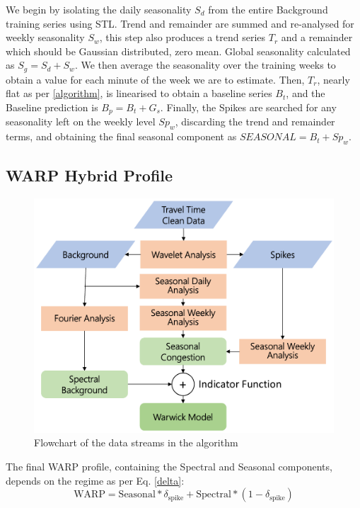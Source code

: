 \documentclass[a4paper, 10pt, conference]{ieeeconf}      %
\begin{document}
We begin by isolating the daily seasonality $S_d$ from the entire Background training series using STL.
Trend and remainder are summed and re-analysed for weekly seasonality $S_w$, this step also produces a trend series $T_r$ and a remainder which should be Gaussian distributed, zero mean.
Global seasonality calculated as $S_g = S_d + S_w$.
We then average the seasonality over the training weeks to obtain a value for each minute of the week we are to estimate.
Then, $T_r$, nearly flat as per \ref{algorithm}, is linearised to obtain a baseline series $B_t$, and the Baseline prediction is $B_p = B_t + G_s$.
Finally, the Spikes are searched for any seasonality left on the weekly level $Sp_w$, discarding the trend and remainder terms, and obtaining the final seasonal component as $\textit{SEASONAL} = B_t + {Sp}_w$.

\subsection{WARP Hybrid Profile}
\begin{figure}[htbp]
	\centerline{\includegraphics[width=\linewidth]{./images/flow_crop.pdf}}
	\caption{Flowchart of the data streams in the algorithm}
	\label{fig:dataflow}
\end{figure}
The final WARP profile, containing the Spectral and Seasonal components, depends on the regime as per Eq. \ref{delta}:
\begin{equation}
\textrm{WARP} = \textrm{Seasonal} * \delta_{\textrm{spike}} + \textrm{Spectral} * (1 - \delta_{\textrm{spike}})
\end{equation}
\end{document}
